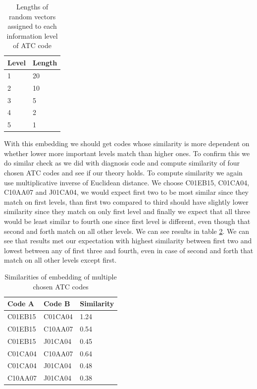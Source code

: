 \begin{table}[!h]
	\centering
	\begin{tabular}{|l|l|}
		\hline
		Level  & Length \\ \hline
		1 & 20 \\ \hline
		2 & 10 \\ \hline
		3 & 5 \\ \hline
		4 & 2 \\ \hline
		5 & 1 \\ \hline
	\end{tabular}
	\caption{Lengths of random vectors assigned to each information level of ATC code}
	\label{tab:drug_lev_len}
\end{table}  

With this embedding we should get codes whose similarity is more dependent on whether lower more important levels match than higher ones. To confirm this we do similar check as we did with diagnosis code and compute similarity of four chosen ATC codes and see if our theory holds. To compute similarity we again use multiplicative inverse of Euclidean distance. We choose C01EB15, C01CA04, C10AA07 and J01CA04, we would expect first two to be most similar since they match on first levels, than first two compared to third should have slightly lower similarity since they match on only first level and finally we expect that all three would be least similar to fourth one since first level is different, even though that second and forth match on all other levels.  We can see results in table \ref{tab:drug_emb_show}. We can see that results met our expectation with highest similarity between first two and lowest between any of first three and fourth, even in case of second and forth that match on all other levels except first.

\begin{table}[!h]
	\centering
	\begin{tabular}{|l|l|l|}
		\hline
		Code A & Code B & Similarity \\ \hline
		C01EB15 & C01CA04 & 1.24      \\ \hline
		C01EB15 & C10AA07 & 0.54       \\ \hline
		C01EB15 & J01CA04 & 0.45       \\ \hline
		C01CA04 & C10AA07 & 0.64       \\ \hline
		C01CA04 & J01CA04 & 0.48       \\ \hline
		C10AA07 & J01CA04 & 0.38       \\ \hline
	\end{tabular}
	\caption{Similarities of embedding of multiple chosen ATC codes}
	\label{tab:drug_emb_show}
\end{table}  

